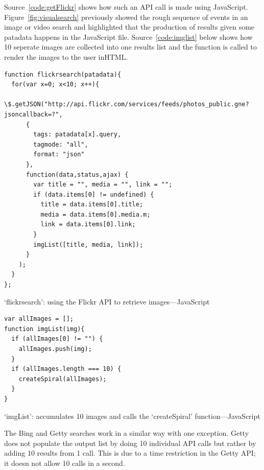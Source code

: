 Source~\ref{code:getFlickr} shows how such an \ac{API} call is made using JavaScript. Figure~\ref{fig:visualsearch} previously showed the rough sequence of events in an image or video search and highlighted that the production of results given some patadata happens in the  JavaScript file. Source~\ref{code:imglist} below shows how 10 seperate images are collected into one results list and the  function is called to render the images to the user in\ac{HTML}.

\begin{listing}[!htbp] %
  \begin{verbatim}
function flickrsearch(patadata){
  for(var x=0; x<10; x++){
    \$.getJSON("http://api.flickr.com/services/feeds/photos_public.gne?jsoncallback=?",
      {
        tags: patadata[x].query,
        tagmode: "all",
        format: "json"
      },
      function(data,status,ajax) {
        var title = "", media = "", link = "";
        if (data.items[0] != undefined) {
          title = data.items[0].title;
          media = data.items[0].media.m;
          link = data.items[0].link;
        }
        imgList([title, media, link]);
      }
    );
  }
};
  \end{verbatim}
\caption[`flickrsearch' function---JavaScript]{`flickrsearch': using the Flickr API to retrieve images---JavaScript}
\label{code:getFlickr}
\end{listing}

\begin{listing}[!htbp] %
  \begin{verbatim}
var allImages = [];
function imgList(img){
  if (allImages[0] != "") {
    allImages.push(img);
  }
  if (allImages.length === 10) {
    createSpiral(allImages);
  }
}
  \end{verbatim}
\caption[`imgList' function---JavaScript]{`imgList': accumulates 10 images and calls the `createSpiral' function---JavaScript}
\label{code:imglist}
\end{listing}

The Bing and Getty searches work in a similar way with one exception. Getty does not populate the output list by doing 10 individual \ac{API} calls but rather by adding 10 results from 1 call. This is due to a time restriction in the Getty \ac{API}; it doesn not allow 10 calls in a second.

